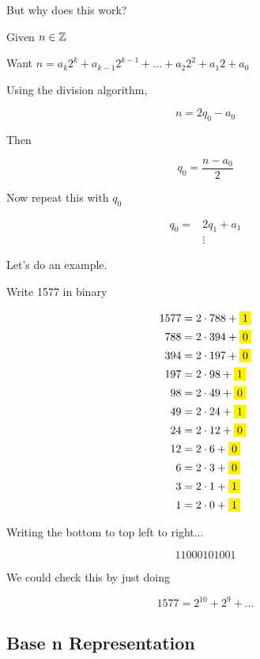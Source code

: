 \documentclass[../../Main.tex]{subfiles}
\begin{document}
But why does this work?

Given $n \in \mathbb{Z}$

Want $n = a_k2^k + a_{k - 1}2^{k - 1} + \ldots + a_2 2^2 + a_1 2 + a_0$

Using the division algorithm,

$$n = 2q_0 - a_0$$

Then 

$$q_0 = \frac{n - a_0}{2}$$

Now repeat this with $q_0$

\begin{align*}
    q_0 = &2q_1 + a_1 \\
    &\vdots
\end{align*}

Let's do an example.

\begin{example}
    Write 1577 in binary

    \begin{align*}
        1577 &= 2 \cdot 788 + \yellowbox{1} \\
        788 &= 2 \cdot 394 + \yellowbox{0} \\
        394 &= 2 \cdot 197 + \yellowbox{0} \\
        197 &= 2 \cdot 98 + \yellowbox{1} \\
        98 &= 2 \cdot 49 + \yellowbox{0} \\
        49 &= 2 \cdot 24 + \yellowbox{1} \\
        24 &= 2 \cdot 12 + \yellowbox{0} \\
        12 &= 2 \cdot 6 + \yellowbox{0} \\
        6 &= 2 \cdot 3 + \yellowbox{0} \\
        3 &= 2 \cdot 1 + \yellowbox{1} \\
        1 &= 2 \cdot 0 + \yellowbox{1} \\
    \end{align*}

    Writing the bottom to top left to right...

    $$\boxed{11000101001}$$

    We could check this by just doing 

    $$1577 = 2^{10} + 2^9 + \ldots $$
    
\end{example}

\subsection{Base n Representation}
\end{document}
